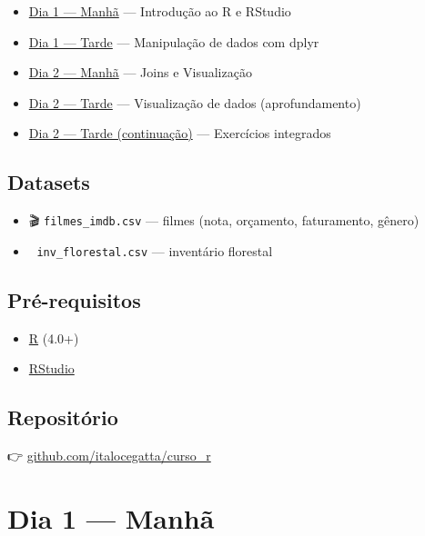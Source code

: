 \documentclass[
  letterpaper,
]{scrbook}
\providecommand{\tightlist}{%
  \setlength{\itemsep}{0pt}\setlength{\parskip}{0pt}}
\begin{document}
\begin{itemize}
\tightlist
\item
  \href{d1-manha.qmd}{Dia 1 --- Manhã} --- Introdução ao R e RStudio
\item
  \href{d1-tarde.qmd}{Dia 1 --- Tarde} --- Manipulação de dados com
  dplyr
\item
  \href{d2-manha.qmd}{Dia 2 --- Manhã} --- Joins e Visualização
\item
  \href{d2-tarde.qmd}{Dia 2 --- Tarde} --- Visualização de dados
  (aprofundamento)
\item
  \href{d2-tarde-parte2.qmd}{Dia 2 --- Tarde (continuação)} ---
  Exercícios integrados
\end{itemize}

\section{Datasets}\label{datasets-1}

\begin{itemize}
\tightlist
\item
  🎬 \texttt{filmes\_imdb.csv} --- filmes (nota, orçamento, faturamento,
  gênero)
\item
  🌲 \texttt{inv\_florestal.csv} --- inventário florestal
\end{itemize}

\section{Pré-requisitos}\label{pruxe9-requisitos-2}

\begin{itemize}
\tightlist
\item
  \href{https://cran.r-project.org/}{R} (4.0+)
\item
  \href{https://posit.co/download/rstudio-desktop/}{RStudio}
\end{itemize}

\section{Repositório}\label{reposituxf3rio-2}

👉
\href{https://github.com/italocegatta/curso_r}{github.com/italocegatta/curso\_r}

\chapter{Dia 1 --- Manhã}\label{dia-1-manhuxe3-1}
\end{document}

